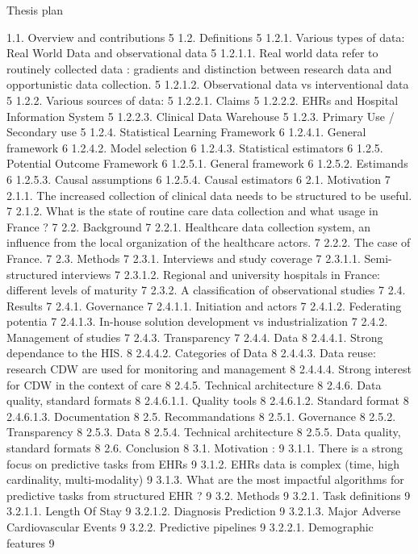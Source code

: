 Thesis plan

1.1. Overview and contributions	5
1.2. Definitions	5
1.2.1. Various types of data: Real World Data and observational data	5
1.2.1.1. Real world data refer to routinely collected data : gradients and distinction between research data and opportunistic data collection.	5
1.2.1.2. Observational data vs interventional data	5
1.2.2. Various sources of data:	5
1.2.2.1. Claims	5
1.2.2.2. EHRs and Hospital Information System	5
1.2.2.3. Clinical Data Warehouse	5
1.2.3. Primary Use / Secondary use	5
1.2.4. Statistical Learning Framework	6
1.2.4.1. General framework	6
1.2.4.2. Model selection	6
1.2.4.3. Statistical estimators	6
1.2.5. Potential Outcome Framework	6
1.2.5.1. General framework	6
1.2.5.2. Estimands	6
1.2.5.3. Causal assumptions	6
1.2.5.4. Causal estimators	6
2.1. Motivation	7
2.1.1. The increased collection of clinical data needs to be structured to be useful.	7
2.1.2. What is the state of routine care data collection and what usage in France ?	7
2.2. Background	7
2.2.1. Healthcare data collection system, an influence from the local organization of the healthcare actors.	7
2.2.2. The case of France.	7
2.3. Methods	7
2.3.1. Interviews and study coverage	7
2.3.1.1. Semi-structured interviews	7
2.3.1.2. Regional and university hospitals in France: different levels of maturity	7
2.3.2. A classification of observational studies	7
2.4. Results	7
2.4.1. Governance	7
2.4.1.1. Initiation and actors	7
2.4.1.2. Federating potentia	7
2.4.1.3. In-house solution development vs industrialization	7
2.4.2. Management of studies	7
2.4.3. Transparency	7
2.4.4. Data	8
2.4.4.1. Strong dependance to the HIS.	8
2.4.4.2. Categories of Data	8
2.4.4.3. Data reuse: research
CDW are used for monitoring and management	8
2.4.4.4. Strong interest for CDW in the context of care	8
2.4.5. Technical architecture	8
2.4.6. Data quality, standard formats	8
2.4.6.1.1. Quality tools	8
2.4.6.1.2. Standard format	8
2.4.6.1.3. Documentation	8
2.5. Recommandations	8
2.5.1. Governance	8
2.5.2. Transparency	8
2.5.3. Data	8
2.5.4. Technical architecture	8
2.5.5. Data quality, standard formats	8
2.6. Conclusion	8
3.1. Motivation :	9
3.1.1. There is a strong focus on predictive tasks from EHRs	9
3.1.2. EHRs data is complex (time, high cardinality, multi-modality)	9
3.1.3. What are the most impactful algorithms for predictive tasks from structured EHR ?	9
3.2. Methods	9
3.2.1. Task definitions	9
3.2.1.1. Length Of Stay	9
3.2.1.2. Diagnosis Prediction	9
3.2.1.3. Major Adverse Cardiovascular Events	9
3.2.2. Predictive pipelines	9
3.2.2.1. Demographic features	9
